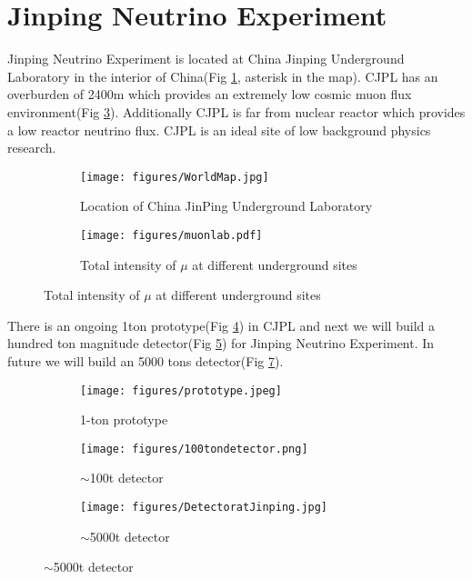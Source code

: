 \section{Jinping Neutrino Experiment} %
Jinping Neutrino Experiment is located at China Jinping Underground Laboratory in the interior of China(Fig \ref{fig:cjpl}, asterisk in the map). CJPL has an overburden of 2400m which provides an extremely low cosmic muon flux environment(Fig \ref{fig:muon}). Additionally CJPL is far from nuclear reactor which provides a low reactor neutrino flux. CJPL is an ideal site of low background physics research. 

\begin{figure}[H]
\begin{minipage}{.4\textwidth}
\begin{figure}[H]
    \centering
        \texttt{[image: figures/WorldMap.jpg]}
    \caption{Location of China JinPing Underground Laboratory}
    \label{fig:cjpl}
\end{figure}
\end{minipage}
\begin{minipage}{.6\textwidth}
\begin{figure}[H]
    \centering
        \texttt{[image: figures/muonlab.pdf]}
    \caption{Total intensity of $\mu$ at different underground sites}
    \label{fig:muon}
\end{figure}
\end{minipage}
\end{figure}

There is an ongoing 1ton prototype(Fig \ref{fig:1t}) in CJPL and next we will build a hundred ton magnitude detector(Fig \ref{fig:100t}) for Jinping Neutrino Experiment. In future we will build an 5000 tons detector(Fig \ref{fig:1kt}). 

\begin{figure}[H]
\begin{minipage}{.33\textwidth}
\begin{figure}[H]
    \centering
    \caption{1-ton prototype}
    \texttt{[image: figures/prototype.jpeg]}
    \label{fig:1t}
\end{figure}
\end{minipage}
\begin{minipage}{.34\textwidth}
\begin{figure}[H]
    \centering
    \caption{$\sim$100t detector}
    \texttt{[image: figures/100tondetector.png]}
    \label{fig:100t}
\end{figure}
\end{minipage}
\begin{minipage}{.33\textwidth}
\begin{figure}[H]
    \centering
    \caption{$\sim$5000t detector}
    \texttt{[image: figures/DetectoratJinping.jpg]}
    \label{fig:1kt}
\end{figure}
\end{minipage}
\end{figure}

